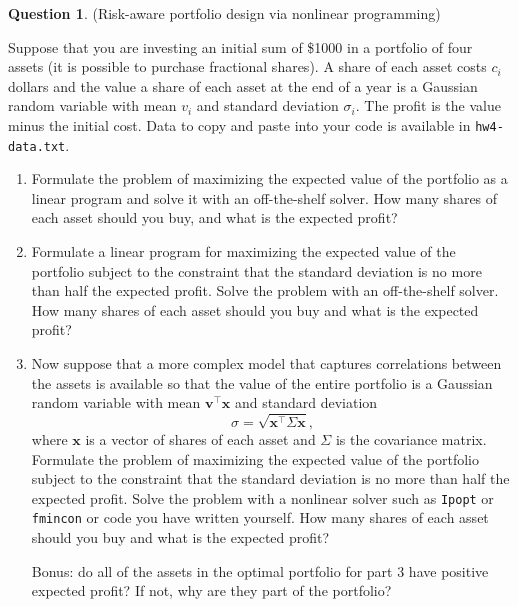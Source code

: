 \documentclass{article}
\theoremstyle{definition}
\newtheorem{question}[thm]{Question}
\begin{document}
\begin{question}(Risk-aware portfolio design via nonlinear programming)

    Suppose that you are investing an initial sum of \$1000 in a portfolio of four assets (it is possible to purchase fractional shares).
    A share of each asset costs $c_i$ dollars and the value a share of each asset at the end of a year is a Gaussian random variable with mean $v_i$ and standard deviation $\sigma_i$. The profit is the value minus the initial cost. Data to copy and paste into your code is available in \texttt{hw4-data.txt}.
    \begin{enumerate}
        \item Formulate the problem of maximizing the expected value of the portfolio as a linear program and solve it with an off-the-shelf solver. How many shares of each asset should you buy, and what is the expected profit?
        \item Formulate a linear program for maximizing the expected value of the portfolio subject to the constraint that the standard deviation is no more than half the expected profit. Solve the problem with an off-the-shelf solver. How many shares of each asset should you buy and what is the expected profit?
        \item Now suppose that a more complex model that captures correlations between the assets is available so that the value of the entire portfolio is a Gaussian random variable with mean $\mathbf{v}^\top \mathbf{x}$ and standard deviation $$\sigma = \sqrt{\mathbf{x}^\top \Sigma \mathbf{x}} \text{,}$$ where $\mathbf{x}$ is a vector of shares of each asset and $\Sigma$ is the covariance matrix. Formulate the problem of maximizing the expected value of the portfolio subject to the constraint that the standard deviation is no more than half the expected profit. Solve the problem with a nonlinear solver such as \texttt{Ipopt} or \texttt{fmincon} or code you have written yourself. How many shares of each asset should you buy and what is the expected profit?
        
        Bonus: do all of the assets in the optimal portfolio for part 3 have positive expected profit? If not, why are they part of the portfolio?
    \end{enumerate}
\end{question}
\end{document}
